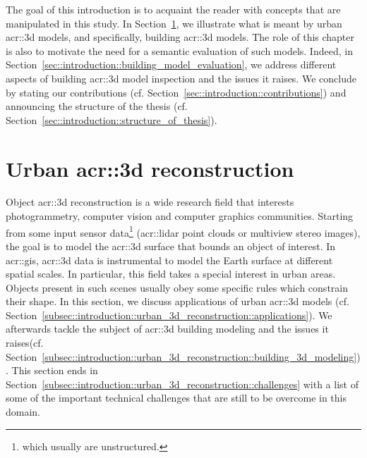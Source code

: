 \minitoc

\vfill

The goal of this introduction is to acquaint the reader with concepts that are manipulated in this study.
In Section~\ref{sec::introduction::urban_3d_reconstruction}, we illustrate what is meant by urban \gls{acr::3d} models, and specifically,  building \gls{acr::3d} models.
The role of this chapter is also to motivate the need for a semantic evaluation of such models.
Indeed, in Section~\ref{sec::introduction::building_model_evaluation}, we address different aspects of building \gls{acr::3d} model inspection and the issues it raises.
We conclude by stating our contributions (cf. Section~\ref{sec::introduction::contributions}) and announcing the structure of the thesis (cf. Section~\ref{sec::introduction::structure_of_thesis}).

\clearpage

\section{Urban \texorpdfstring{\acrshort*{acr::3d}}{3D} reconstruction}
    \label{sec::introduction::urban_3d_reconstruction}
    Object \gls{acr::3d} reconstruction is a wide research field that interests photogrammetry, computer vision and computer graphics communities.
    Starting from some input sensor data\footnote{which usually are unstructured.} (\gls{acr::lidar} point clouds or multiview stereo images), the goal is to model the \gls{acr::3d} surface that bounds an object of interest.
    In \acrfull{acr::gis}, \gls{acr::3d} data is instrumental to model the Earth surface at different spatial scales.
    In particular, this field takes a special interest in urban areas.
    Objects present in such scenes usually obey some specific rules which constrain their shape.
    In this section, we discuss applications of urban \gls{acr::3d} models (cf. Section~\ref{subsec::introduction::urban_3d_reconstruction::applications}).
    We afterwards tackle the subject of  \gls{acr::3d} building modeling and the issues it raises(cf. Section~\ref{subsec::introduction::urban_3d_reconstruction::building_3d_modeling}).
    This section ends in Section~\ref{subsec::introduction::urban_3d_reconstruction::challenges} with a list of some of the important technical challenges that are still to be overcome in this domain.

